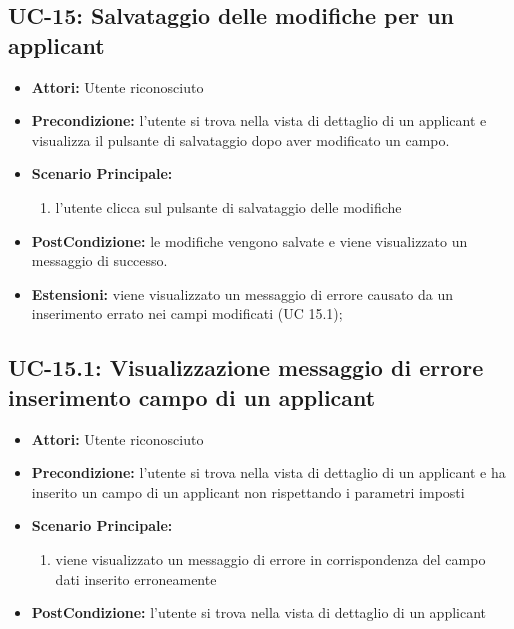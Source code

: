 \subsection{UC-15: Salvataggio delle modifiche per un applicant}
\begin{itemize}
\item \textbf{Attori:} Utente riconosciuto
\item \textbf{Precondizione:} l'utente si trova nella vista di dettaglio di un applicant e visualizza il pulsante di salvataggio dopo aver modificato un campo.
\item \textbf{Scenario Principale:}
\begin{enumerate}
	\item l'utente clicca sul pulsante di salvataggio delle modifiche 
\end{enumerate}
\item \textbf{PostCondizione:} le modifiche vengono salvate e viene visualizzato un messaggio di successo.
\item \textbf{Estensioni:} viene visualizzato un messaggio di errore causato da un inserimento errato nei campi modificati (UC 15.1);
\end{itemize}



\subsection{UC-15.1: Visualizzazione messaggio di errore inserimento campo di un applicant}
\begin{itemize}
\item \textbf{Attori:} Utente riconosciuto
\item \textbf{Precondizione:}  l'utente si trova nella vista di dettaglio di un applicant e ha inserito un campo di un  applicant non rispettando i parametri imposti
\item \textbf{Scenario Principale:}
\begin{enumerate}
	\item viene visualizzato un messaggio di errore in corrispondenza del campo dati inserito erroneamente
\end{enumerate}
\item \textbf{PostCondizione:}  l'utente si trova nella vista di dettaglio di un applicant
\end{itemize}




